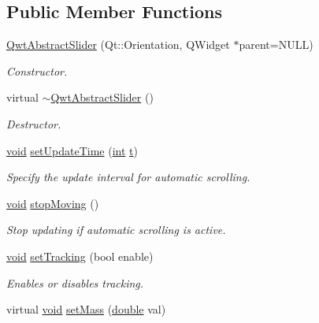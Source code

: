\subsection*{Public Member Functions}
\begin{DoxyCompactItemize}
\item 
\hyperlink{class_qwt_abstract_slider_a5d23c0db6786757d7523b7fbfb3c34c9}{Qwt\-Abstract\-Slider} (Qt\-::\-Orientation, Q\-Widget $\ast$parent=N\-U\-L\-L)
\begin{DoxyCompactList}\small\item\em Constructor. \end{DoxyCompactList}\item 
virtual \hyperlink{class_qwt_abstract_slider_a31b9e0314988b7d547c9ded625014bbb}{$\sim$\-Qwt\-Abstract\-Slider} ()
\begin{DoxyCompactList}\small\item\em Destructor. \end{DoxyCompactList}\item 
\hyperlink{group___u_a_v_objects_plugin_ga444cf2ff3f0ecbe028adce838d373f5c}{void} \hyperlink{class_qwt_abstract_slider_a945ba36e1b8e20d362083f6737b0601d}{set\-Update\-Time} (\hyperlink{ioapi_8h_a787fa3cf048117ba7123753c1e74fcd6}{int} \hyperlink{glext_8h_a00140d6f5c548b26daf170bf16e86a6d}{t})
\begin{DoxyCompactList}\small\item\em Specify the update interval for automatic scrolling. \end{DoxyCompactList}\item 
\hyperlink{group___u_a_v_objects_plugin_ga444cf2ff3f0ecbe028adce838d373f5c}{void} \hyperlink{class_qwt_abstract_slider_ab648229c972d0c3258d30b0c43eb5efc}{stop\-Moving} ()
\begin{DoxyCompactList}\small\item\em Stop updating if automatic scrolling is active. \end{DoxyCompactList}\item 
\hyperlink{group___u_a_v_objects_plugin_ga444cf2ff3f0ecbe028adce838d373f5c}{void} \hyperlink{class_qwt_abstract_slider_a91c03aada61745d8924f47319afefee1}{set\-Tracking} (bool enable)
\begin{DoxyCompactList}\small\item\em Enables or disables tracking. \end{DoxyCompactList}\item 
virtual \hyperlink{group___u_a_v_objects_plugin_ga444cf2ff3f0ecbe028adce838d373f5c}{void} \hyperlink{class_qwt_abstract_slider_a305b137fe4dd80cba307fe1b4bd46272}{set\-Mass} (\hyperlink{_super_l_u_support_8h_a8956b2b9f49bf918deed98379d159ca7}{double} val)

\end{DoxyCompactItemize}
